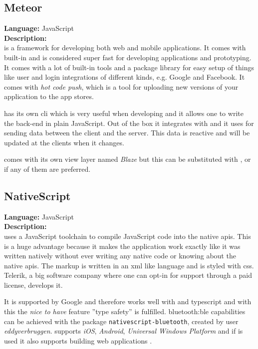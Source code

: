 \subsection*{Meteor}
\textbf{Language:} JavaScript
\\
\textbf{Description:}
\\
 is a framework for developing both web and mobile applications.
It comes with  built-in and is considered super fast for developing applications and prototyping.
It comes with a lot of built-in tools and a package library for easy setup of things like user and login integrations of different kinds, e.g. Google and Facebook. It comes with \textit{hot code push}, which is a tool for uploading new versions of your application to the app stores.

 has its own \gls{cli} which is very useful when developing and it allows one to write the back-end in plain JavaScript.
Out of the box it integrates with  and it uses  for sending data between the client and the server.
This data is reactive and will be updated at the clients when it changes.

 comes with its own view layer named \textit{Blaze} but this can be substituted with ,  or  if any of them are preferred.

\subsection*{NativeScript}
\textbf{Language:} JavaScript
\\
\textbf{Description:}
\\
 uses a JavaScript toolchain to compile JavaScript code into the native \glspl{api}.
This is a huge advantage because it makes the application work exactly like it was written natively without ever writing any native code or knowing about the native \glspl{api}.
The markup is written in an \gls{xml} like language and is styled with \gls{css}.
Telerik, a big software company where one can opt-in for support through a paid license, develops it.

It is supported by Google and therefore works well with  and \gls{typescript} and with this the \textit{nice to have} feature ''type safety'' is fulfilled.
\Gls{bluetooth:ble} capabilities can be achieved with the  package \verb+nativescript-bluetooth+, created by  user \textit{eddyverbruggen}.
 supports \textit{iOS}, \textit{Android}, \textit{Universal Windows Platform} and if  is used it also supports building web applications \citep{preStudy:frameworks:nativescript}.


